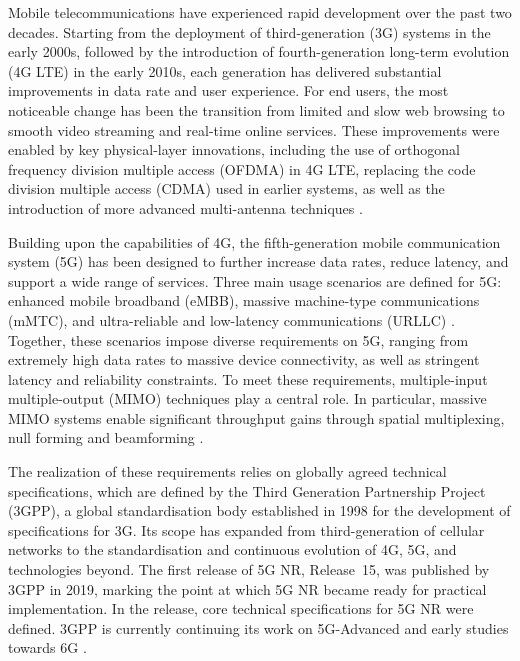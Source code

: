 \documentclass[a4paper,12pt,onecolumn]{article}
\begin{document}
\begin{highlightblock}
	
	Mobile telecommunications have experienced rapid development over the past two decades. Starting from the deployment of third-generation (3G) systems in the early 2000s, followed by the introduction of fourth-generation long-term evolution (4G LTE) in the early 2010s, each generation has delivered substantial improvements in data rate and user experience. For end users, the most noticeable change has been the transition from limited and slow web browsing to smooth video streaming and real-time online services. These improvements were enabled by key physical-layer innovations, including the use of orthogonal frequency division multiple access (OFDMA) in 4G LTE, replacing the code division multiple access (CDMA) used in earlier systems, as well as the introduction of more advanced multi-antenna techniques \cite{Manikas}.
	
	Building upon the capabilities of 4G, the fifth-generation mobile communication system (5G) has been designed to further increase data rates, reduce latency, and support a wide range of services. Three main usage scenarios are defined for 5G: enhanced mobile broadband (eMBB), massive machine-type communications (mMTC), and ultra-reliable and low-latency communications (URLLC) \cite{EricssonBook}. Together, these scenarios impose diverse requirements on 5G, ranging from extremely high data rates to massive device connectivity, as well as stringent latency and reliability constraints. To meet these requirements, multiple-input multiple-output (MIMO) techniques play a central role. In particular, massive MIMO systems enable significant throughput gains through spatial multiplexing, null forming and beamforming \cite{Ericsson_MIMO}.
	
	The realization of these requirements relies on globally agreed technical specifications, which are defined by the Third Generation Partnership Project (3GPP), a global standardisation body established in 1998 for the development of specifications for 3G. Its scope has expanded from third-generation of cellular networks to the standardisation and continuous evolution of 4G, 5G, and technologies beyond. The first release of 5G NR, Release~15, was published by 3GPP in 2019, marking the point at which 5G NR became ready for practical implementation. In the release, core technical specifications for 5G NR were defined. 3GPP is currently continuing its work on 5G-Advanced and early studies towards 6G \cite{3GPP}. 
\end{highlightblock}
\end{document}
